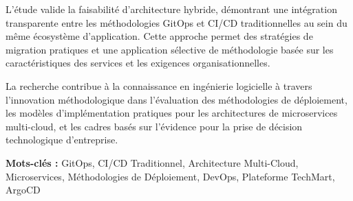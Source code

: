 L'étude valide la faisabilité d'architecture hybride, démontrant une intégration transparente entre les méthodologies GitOps et CI/CD traditionnelles au sein du même écosystème d'application. Cette approche permet des stratégies de migration pratiques et une application sélective de méthodologie basée sur les caractéristiques des services et les exigences organisationnelles.

La recherche contribue à la connaissance en ingénierie logicielle à travers l'innovation méthodologique dans l'évaluation des méthodologies de déploiement, les modèles d'implémentation pratiques pour les architectures de microservices multi-cloud, et les cadres basés sur l'évidence pour la prise de décision technologique d'entreprise.

\textbf{Mots-clés :} GitOps, CI/CD Traditionnel, Architecture Multi-Cloud, Microservices, Méthodologies de Déploiement, DevOps, Plateforme TechMart, ArgoCD

\newpage

\newpage